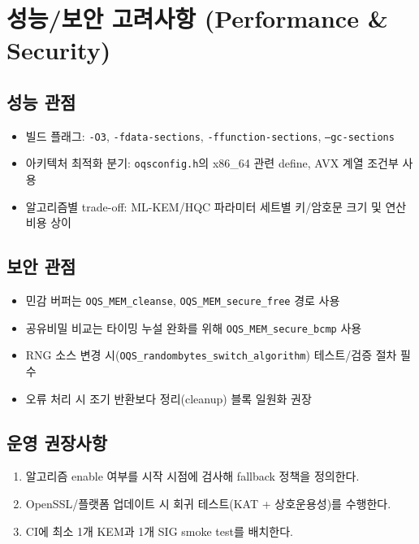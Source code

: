 \section{성능/보안 고려사항 (Performance \& Security)}

\subsection{성능 관점}
\begin{itemize}[leftmargin=*]
\item 빌드 플래그: \texttt{-O3}, \texttt{-fdata-sections}, \texttt{-ffunction-sections}, \texttt{--gc-sections}
\item 아키텍처 최적화 분기: \texttt{oqsconfig.h}의 x86\_64 관련 define, AVX 계열 조건부 사용
\item 알고리즘별 trade-off: ML-KEM/HQC 파라미터 세트별 키/암호문 크기 및 연산비용 상이
\end{itemize}

\subsection{보안 관점}
\begin{itemize}[leftmargin=*]
\item 민감 버퍼는 \texttt{OQS\_MEM\_cleanse}, \texttt{OQS\_MEM\_secure\_free} 경로 사용
\item 공유비밀 비교는 타이밍 누설 완화를 위해 \texttt{OQS\_MEM\_secure\_bcmp} 사용
\item RNG 소스 변경 시(\texttt{OQS\_randombytes\_switch\_algorithm}) 테스트/검증 절차 필수
\item 오류 처리 시 조기 반환보다 정리(cleanup) 블록 일원화 권장
\end{itemize}

\subsection{운영 권장사항}
\begin{enumerate}[leftmargin=*]
\item 알고리즘 enable 여부를 시작 시점에 검사해 fallback 정책을 정의한다.
\item OpenSSL/플랫폼 업데이트 시 회귀 테스트(KAT + 상호운용성)를 수행한다.
\item CI에 최소 1개 KEM과 1개 SIG smoke test를 배치한다.
\end{enumerate}
